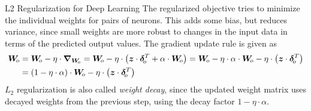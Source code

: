 \begin{frame}{L2 Regularization for Deep Learning}
The regularized objective tries to minimize the individual weights
for pairs of neurons. 
This adds some bias, but 
reduces variance, since small weights are more robust to changes in the
input data in terms of the predicted output values.
%
The gradient update rule is %
given as
\begin{align*}
    \bW_{\!o} & = \bW_{\!o} - \eta \cdot \bgrad_{\bW_{\!o}}
    = \bW_{\!o} - \eta \cdot \lB(\bz \cdot \bdelta_{\!o}^T +
    \alpha \cdot \bW_{\!o}\rB)
     = \bW_{\!o} - \eta \cdot \alpha \cdot \bW_{\!o} - \eta \cdot \lB(\bz \cdot
     \bdelta_{\!o}^T \rB)\\
     & = (1-\eta\cdot\alpha) \cdot \bW_{\!o} - \eta \cdot \lB(\bz \cdot \bdelta_{\!o}^T \rB)
\end{align*}
$L_2$ regularization is also called {\em weight decay}, since 
the updated weight matrix uses decayed weights from the
previous step, using the decay factor $1-\eta \cdot \alpha$.
\end{frame}
